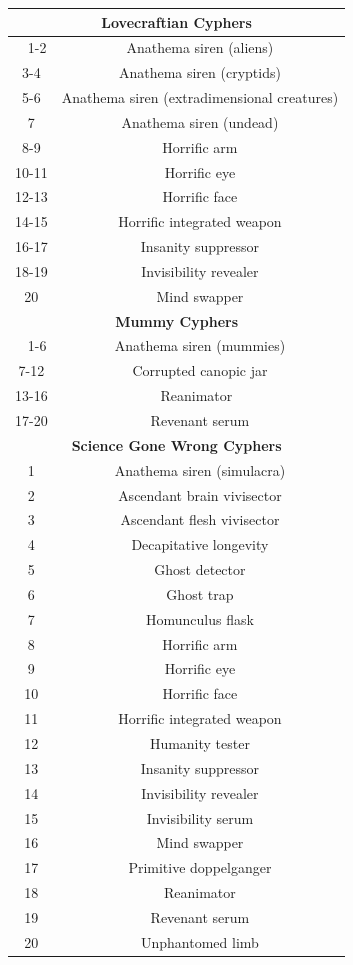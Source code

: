 \begin{longtable}{| c | c |}
\multicolumn{2}{|c|}{\textbf{Lovecraftian Cyphers}} \\ \hline 
1-2 & Anathema siren (aliens) \\ \hline
3-4 & Anathema siren (cryptids) \\ \hline
5-6 & Anathema siren (extradimensional creatures) \\ \hline
7 & Anathema siren (undead) \\ \hline
8-9 & Horrific arm \\ \hline
10-11 & Horrific eye \\ \hline
12-13 & Horrific face \\ \hline
14-15 & Horrific integrated weapon \\ \hline
16-17 & Insanity suppressor \\ \hline
18-19 & Invisibility revealer \\ \hline
20 & Mind swapper \\ \hline

\multicolumn{2}{|c|}{\textbf{Mummy Cyphers}} \\ \hline 
1-6 & Anathema siren (mummies) \\ \hline
7-12 & Corrupted canopic jar \\ \hline
13-16 & Reanimator  \\ \hline
17-20 & Revenant serum \\ \hline

\multicolumn{2}{|c|}{\textbf{Science Gone Wrong Cyphers}} \\ \hline
1 & Anathema siren (simulacra) \\ \hline
2 & Ascendant brain vivisector \\ \hline
3 & Ascendant flesh vivisector \\ \hline
4 & Decapitative longevity \\ \hline
5 & Ghost detector \\ \hline
6 & Ghost trap \\ \hline
7 & Homunculus flask \\ \hline
8 & Horrific arm \\ \hline
9 & Horrific eye \\ \hline
10 & Horrific face \\ \hline
11 & Horrific integrated weapon \\ \hline
12 & Humanity tester \\ \hline
13 & Insanity suppressor \\ \hline
14 & Invisibility revealer \\ \hline
15 & Invisibility serum \\ \hline
16 & Mind swapper \\ \hline
17 & Primitive doppelganger \\ \hline
18 & Reanimator \\ \hline
19 & Revenant serum \\ \hline
20 & Unphantomed limb \\ \hline


\end{longtable}
